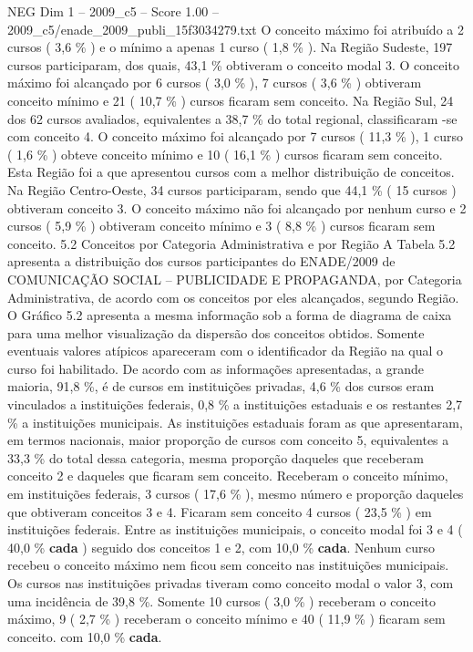 \begin{textsample}{NEG Dim 1 – 2009\_c5 – Score 1.00 – 2009\_c5/enade\_2009\_publi\_15f3034279.txt}
O conceito máximo foi atribuído a 2 cursos ( 3,6 \% ) e o mínimo a apenas 1 curso ( 1,8 \% ).
Na Região Sudeste, 197 cursos participaram, dos quais, 43,1 \% obtiveram o conceito modal 3.
O conceito máximo foi alcançado por 6 cursos ( 3,0 \% ), 7 cursos ( 3,6 \% ) obtiveram conceito mínimo e 21 ( 10,7 \% ) cursos ficaram sem conceito.
Na Região Sul, 24 dos 62 cursos avaliados, equivalentes a 38,7 \% do total regional, classificaram -se com conceito 4.
O conceito máximo foi alcançado por 7 cursos ( 11,3 \% ), 1 curso ( 1,6 \% ) obteve conceito mínimo e 10 ( 16,1 \% ) cursos ficaram sem conceito.
Esta Região foi a que apresentou cursos com a melhor distribuição de conceitos.
Na Região Centro-Oeste, 34 cursos participaram, sendo que 44,1 \% ( 15 cursos ) obtiveram conceito 3.
O conceito máximo não foi alcançado por nenhum curso e 2 cursos ( 5,9 \% ) obtiveram conceito mínimo e 3 ( 8,8 \% ) cursos ficaram sem conceito. 5.2 Conceitos por Categoria Administrativa e por Região A Tabela 5.2 apresenta a distribuição dos cursos participantes do ENADE/2009 de COMUNICAÇÃO SOCIAL – PUBLICIDADE E PROPAGANDA, por Categoria Administrativa, de acordo com os conceitos por eles alcançados, segundo Região.
O Gráfico 5.2 apresenta a mesma informação sob a forma de diagrama de caixa para uma melhor visualização da dispersão dos conceitos obtidos.
Somente eventuais valores atípicos apareceram com o identificador da Região na qual o curso foi habilitado.
De acordo com as informações apresentadas, a grande maioria, 91,8 \%, é de cursos em instituições privadas, 4,6 \% dos cursos eram vinculados a instituições federais, 0,8 \% a instituições estaduais e os restantes 2,7 \% a instituições municipais.
As instituições estaduais foram as que apresentaram, em termos nacionais, maior proporção de cursos com conceito 5, equivalentes a 33,3 \% do total dessa categoria, mesma proporção daqueles que receberam conceito 2 e daqueles que ficaram sem conceito.
Receberam o conceito mínimo, em instituições federais, 3 cursos ( 17,6 \% ), mesmo número e proporção daqueles que obtiveram conceitos 3 e 4.
Ficaram sem conceito 4 cursos ( 23,5 \% ) em instituições federais.
Entre as instituições municipais, o conceito modal foi 3 e 4 ( 40,0 \% \textbf{cada} ) seguido dos conceitos 1 e 2, com 10,0 \% \textbf{cada}.
Nenhum curso recebeu o conceito máximo nem ficou sem conceito nas instituições municipais.
Os cursos nas instituições privadas tiveram como conceito modal o valor 3, com uma incidência de 39,8 \%.
Somente 10 cursos ( 3,0 \% ) receberam o conceito máximo, 9 ( 2,7 \% ) receberam o conceito mínimo e 40 ( 11,9 \% ) ficaram sem conceito. com 10,0 \% \textbf{cada}.

\end{textsample}
